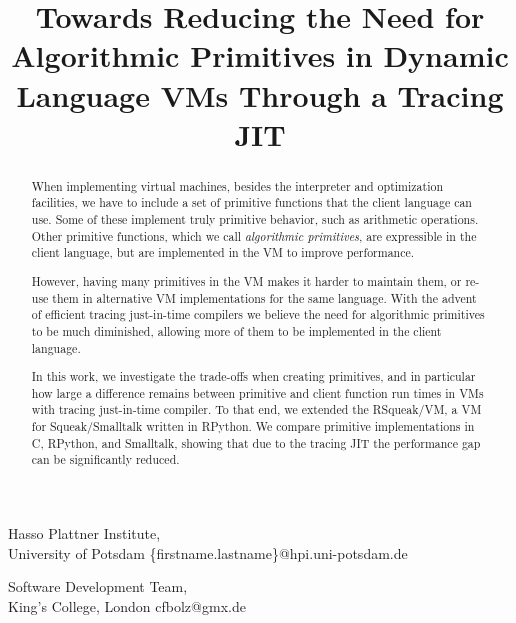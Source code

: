 \documentclass[
10pt,          %
]{sigplanconf}
\begin{document}


\exclusivelicense                %


\title{Towards Reducing the Need for Algorithmic Primitives in Dynamic Language VMs Through a Tracing JIT}

           {Hasso Plattner Institute,\\University of Potsdam}
           {\{firstname.lastname\}@hpi.uni-potsdam.de}

           {Software Development Team,\\King's College, London}
           {cfbolz@gmx.de}

\maketitle

\begin{abstract}
  When implementing virtual machines, besides the interpreter and
  optimization facilities, we have to include a set of primitive
  functions that the client language can use. Some of these implement
  truly primitive behavior, such as arithmetic operations. Other
  primitive functions, which we call \emph{algorithmic primitives},
  are expressible in the client language, but are implemented in the \acs{VM}
  to improve performance.

  However, having many primitives in the \acs{VM} makes it harder to
  maintain them, or re-use them in alternative \acs{VM} implementations for
  the same language. With the advent of efficient tracing just-in-time
  compilers we believe the need for algorithmic primitives to be much
  diminished, allowing more of them to be implemented in the client
  language.

  In this work, we investigate the trade-offs when creating
  primitives, and in particular how large a difference remains between
  primitive and client function run times in \acsp{VM} with tracing
  just-in-time compiler. To that end, we extended the RSqueak/VM, a \acs{VM}
  for Squeak/\hspace{0pt}Smalltalk written in RPython. We compare primitive
  implementations in C, RPython, and Smalltalk, showing that due to
  the tracing \acs{JIT} the performance gap can be significantly reduced.
\end{abstract}
\end{document}
